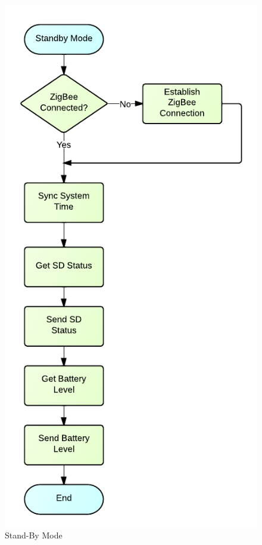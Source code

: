 \begin{figure}[H]
	\centering
	\includegraphics[scale=1.0]{img/StandByMode}
	\caption{Stand-By Mode \label{fig:standByMode}}
\end{figure}

